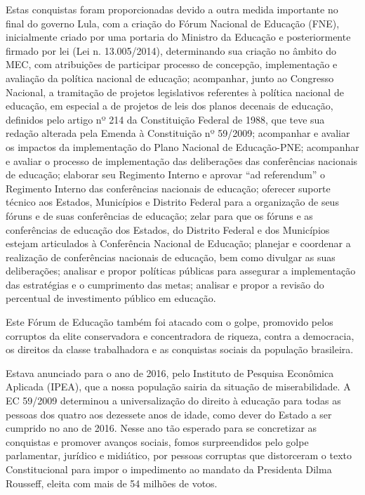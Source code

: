 Estas conquistas foram proporcionadas devido a outra medida importante
no final do governo Lula, com a criação do Fórum Nacional de Educação
(FNE), inicialmente criado por uma portaria do Ministro da Educação e
posteriormente firmado por lei (Lei n. 13.005/2014), determinando sua
criação no âmbito do MEC, com atribuições de participar processo de
concepção, implementação e avaliação da política nacional de educação;
acompanhar, junto ao Congresso Nacional, a tramitação de projetos
legislativos referentes à política nacional de educação, em especial a
de projetos de leis dos planos decenais de educação, definidos pelo
artigo nº 214 da Constituição Federal de 1988, que teve sua redação
alterada pela Emenda à Constituição nº 59/2009; acompanhar e avaliar os
impactos da implementação do Plano Nacional de Educação-PNE; acompanhar
e avaliar o processo de implementação das deliberações das conferências
nacionais de educação; elaborar seu Regimento Interno e aprovar ``ad
referendum'' o Regimento Interno das conferências nacionais de educação;
oferecer suporte técnico aos Estados, Municípios e Distrito Federal para
a organização de seus fóruns e de suas conferências de educação; zelar
para que os fóruns e as conferências de educação dos Estados, do
Distrito Federal e dos Municípios estejam articulados à Conferência
Nacional de Educação; planejar e coordenar a realização de conferências
nacionais de educação, bem como divulgar as suas deliberações; analisar
e propor políticas públicas para assegurar a implementação das
estratégias e o cumprimento das metas;
analisar e propor a revisão do
percentual de investimento público em educação.

Este Fórum de Educação também foi atacado com o golpe, promovido pelos
corruptos da elite conservadora e concentradora de riqueza, contra a
democracia, os direitos da classe trabalhadora e as conquistas sociais
da população brasileira.

Estava anunciado para o ano de 2016, pelo Instituto de Pesquisa
Econômica Aplicada (IPEA), que a nossa população sairia da situação de
miserabilidade. A EC 59/2009 determinou a universalização do direito à
educação para todas as pessoas dos quatro aos dezessete anos de idade,
como dever do Estado a ser cumprido no ano de 2016. Nesse ano tão
esperado para se concretizar as conquistas e promover avanços sociais,
fomos surpreendidos pelo golpe parlamentar, jurídico e midiático, por
pessoas corruptas que distorceram o texto Constitucional para impor o
impedimento ao mandato da Presidenta Dilma Rousseff, eleita com mais de
54 milhões de votos.

